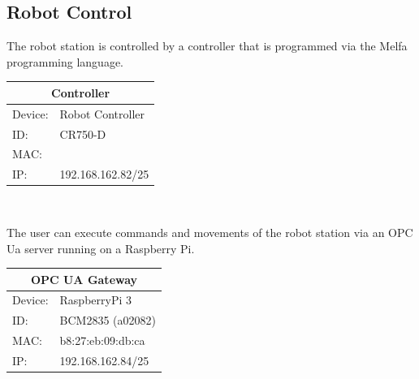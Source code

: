 \documentclass{article}
\begin{document}
\subsection{Robot Control}
The robot station is controlled by a controller that is programmed via the Melfa programming language. 
\begin{center}
	\begin{table}[h]
		\begin{tabular}[h]{|p{1.2cm}p{5.5cm}|}
			\hline
			\multicolumn{2}{|c|}{\bf Controller}\\
			\hline\hline
			Device: & Robot Controller\\
			\hline
			ID: & CR750-D\\
			\hline
			MAC: & \\
			\hline
			IP: & 192.168.162.82/25\\
			\hline
		\end{tabular} \\
		\label{tab:controller}
	\end{table}
\end{center}

The user can execute commands and movements of the robot station via an OPC Ua server running on a Raspberry Pi. 

\begin{center}
	\setlength\extrarowheight{2pt}

	\begin{table}[h]
			\begin{tabular}[h]{|p{1.2cm}p{4.5cm}|}
			\hline
			\multicolumn{2}{|c|}{\bf OPC UA Gateway}\\
			\hline\hline
			Device: & RaspberryPi 3\\
			\hline
			ID: & BCM2835 (a02082)\\
			\hline
			MAC: & b8:27:eb:09:db:ca\\
			\hline
			IP: & 192.168.162.84/25\\
			\hline
		\end{tabular} 
		\label{tab:robot_raspi}
	\end{table}
	

\end{center}
\end{document}
